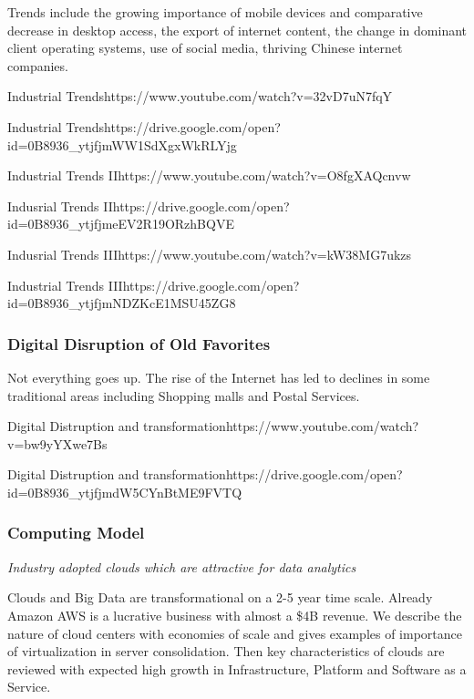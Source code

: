 Trends include the growing importance of mobile devices and comparative
decrease in desktop access, the export of internet content, the change
in dominant client operating systems, use of social media, thriving
Chinese internet companies.


  {Industrial Trends}{https://www.youtube.com/watch?v=32vD7uN7fqY}


  {Industrial
  Trends}{https://drive.google.com/open?id=0B8936_ytjfjmWW1SdXgxWkRLYjg}



   {Industrial Trends  II}{https://www.youtube.com/watch?v=O8fgXAQcnvw}

  {Indusrial
  Trends II}{https://drive.google.com/open?id=0B8936_ytjfjmeEV2R19ORzhBQVE}



  {Indusrial Trends
  III}{https://www.youtube.com/watch?v=kW38MG7ukzs}

  {Industrial
  Trends III}{https://drive.google.com/open?id=0B8936_ytjfjmNDZKcE1MSU45ZG8}


\subsubsection{Digital Disruption of Old
Favorites}\label{digital-disruption-of-old-favorites}

Not everything goes up. The rise of the Internet has led to declines in
some traditional areas including Shopping malls and Postal Services.

{Digital Distruption
and transformation}{https://www.youtube.com/watch?v=bw9yYXwe7Bs} 



  {Digital
  Distruption and transformation}{https://drive.google.com/open?id=0B8936_ytjfjmdW5CYnBtME9FVTQ}


\subsubsection{Computing Model}\label{computing-model}

\emph{Industry adopted clouds which are attractive for data analytics}

Clouds and Big Data are transformational on a 2-5 year time scale.
Already Amazon AWS is a lucrative business with almost a \$4B revenue.
We describe the nature of cloud centers with economies of scale and
gives examples of importance of virtualization in server consolidation.
Then key characteristics of clouds are reviewed with expected high
growth in Infrastructure, Platform and Software as a Service.


